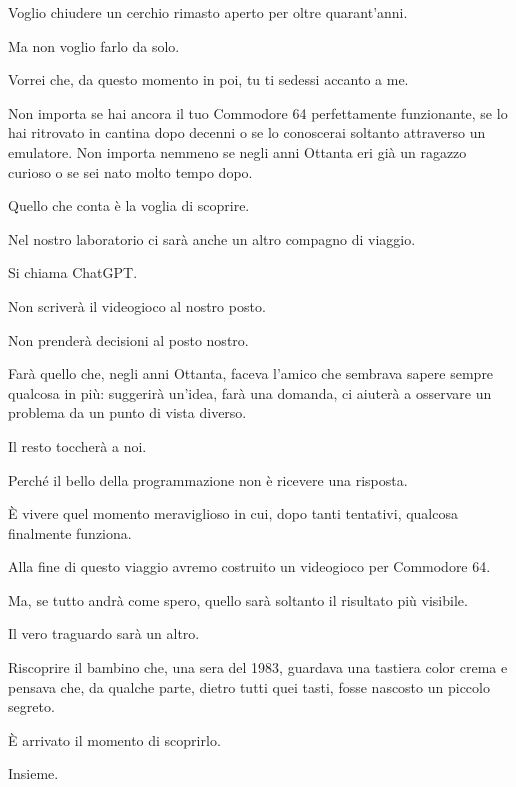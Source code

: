 \documentclass{article}
\begin{document}
Voglio chiudere un cerchio rimasto aperto per oltre quarant'anni.

Ma non voglio farlo da solo.

Vorrei che, da questo momento in poi, tu ti sedessi accanto a me.

Non importa se hai ancora il tuo Commodore 64 perfettamente funzionante, se lo hai ritrovato in cantina dopo decenni o
se lo conoscerai soltanto attraverso un emulatore. Non importa nemmeno se negli anni Ottanta eri già un ragazzo curioso
o se sei nato molto tempo dopo.

Quello che conta è la voglia di scoprire.

Nel nostro laboratorio ci sarà anche un altro compagno di viaggio.

Si chiama ChatGPT.

Non scriverà il videogioco al nostro posto.

Non prenderà decisioni al posto nostro.

Farà quello che, negli anni Ottanta, faceva l'amico che sembrava sapere sempre qualcosa in più: suggerirà un'idea, farà
una domanda, ci aiuterà a osservare un problema da un punto di vista diverso.

Il resto toccherà a noi.

Perché il bello della programmazione non è ricevere una risposta.

È vivere quel momento meraviglioso in cui, dopo tanti tentativi, qualcosa finalmente funziona.

Alla fine di questo viaggio avremo costruito un videogioco per Commodore 64.

Ma, se tutto andrà come spero, quello sarà soltanto il risultato più visibile.

Il vero traguardo sarà un altro.

Riscoprire il bambino che, una sera del 1983, guardava una tastiera color crema e pensava che, da qualche parte, dietro
tutti quei tasti, fosse nascosto un piccolo segreto.

È arrivato il momento di scoprirlo.

Insieme.


\bigskip
\end{document}
